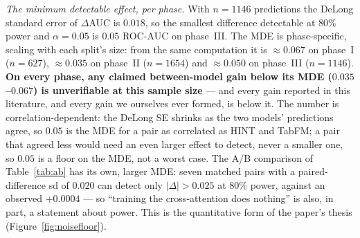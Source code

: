 \documentclass[a4paper,fleqn]{cas-sc}
\begin{document}
\emph{The minimum detectable effect, per phase.} With $n{=}1146$ predictions the DeLong standard
error of $\Delta$AUC is $0.018$, so the smallest difference detectable at $80\%$ power and
$\alpha{=}0.05$ is $\mathbf{0.05}$ ROC-AUC on phase~III. The MDE is phase-specific, scaling with
each split's size: from the same computation it is $\approx0.067$ on phase~I ($n{=}627$),
$\approx0.035$ on phase~II ($n{=}1654$) and $\approx0.050$ on phase~III ($n{=}1146$). \textbf{On
every phase, any claimed between-model gain below its MDE ($0.035$--$0.067$) is unverifiable at
this sample size} --- and every gain reported in this literature, and every gain we ourselves
ever formed, is below it.
The number is correlation-dependent: the DeLong SE shrinks as the two models' predictions
agree, so $0.05$ is the MDE for a pair as correlated as HINT and TabFM; a pair that agreed less
would need an even larger effect to detect, never a smaller one, so $0.05$ is a floor on the
MDE, not a worst case. The A/B comparison of Table~\ref{tab:ab} has its own, larger MDE: seven
matched pairs with a paired-difference sd of $0.020$ can detect only $|\Delta|>0.025$ at $80\%$
power, against an observed $+0.0004$ --- so ``training the cross-attention does nothing'' is
also, in part, a statement about power. This is the quantitative form of the paper's thesis
(Figure~\ref{fig:noisefloor}).
\end{document}
